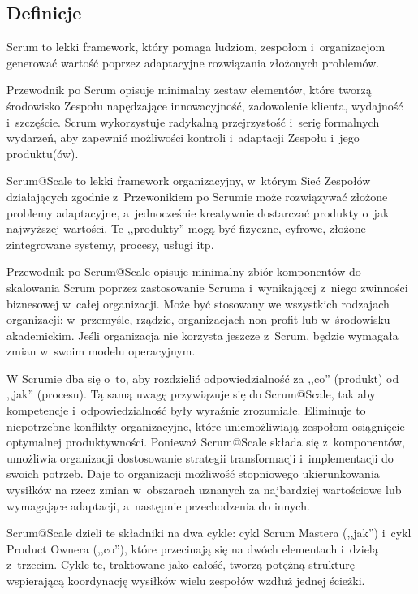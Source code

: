 \documentclass[12pt,a4paper,parskip=full]{scrartcl}
\begin{document}
\subsection{Definicje}\label{definitions}

Scrum to lekki framework, który pomaga ludziom, zespołom i~organizacjom generować wartość poprzez adaptacyjne rozwiązania złożonych problemów.

Przewodnik po Scrum opisuje minimalny zestaw elementów, które tworzą środowisko Zespołu napędzające innowacyjność, zadowolenie klienta, wydajność i~szczęście. Scrum wykorzystuje radykalną przejrzystość i~serię formalnych wydarzeń, aby zapewnić możliwości kontroli i~adaptacji Zespołu i~jego produktu(ów).

Scrum@Scale to lekki framework organizacyjny, w~którym Sieć Zespołów działających zgodnie z~Przewonikiem po Scrumie może rozwiązywać złożone problemy adaptacyjne, a~jednocześnie kreatywnie dostarczać produkty o~jak najwyższej wartości. Te ,,produkty'' mogą być fizyczne, cyfrowe, złożone zintegrowane systemy, procesy, usługi itp.

Przewodnik po Scrum@Scale opisuje minimalny zbiór komponentów do skalowania Scrum poprzez zastosowanie Scruma i~wynikającej z~niego zwinności biznesowej w~całej organizacji. Może być stosowany we wszystkich rodzajach organizacji: w~przemyśle, rządzie, organizacjach non-profit lub w~środowisku akademickim. Jeśli organizacja nie korzysta jeszcze z~Scrum, będzie wymagała zmian w~swoim modelu operacyjnym.

W Scrumie dba się o~to, aby rozdzielić odpowiedzialność za ,,co'' (produkt) od ,,jak'' (procesu). Tą samą uwagę przywiązuje się do Scrum@Scale, tak aby kompetencje i~odpowiedzialność były wyraźnie zrozumiałe. Eliminuje to niepotrzebne konflikty organizacyjne, które uniemożliwiają zespołom osiągnięcie optymalnej produktywności. Ponieważ Scrum@Scale składa się z~komponentów, umożliwia organizacji dos\-to\-so\-wa\-nie strategii transformacji i~implementacji do swoich potrzeb. Daje to organizacji możliwość stopniowego ukierunkowania wysiłków na rzecz zmian w~obszarach uznanych za najbardziej wartościowe lub wymagające adaptacji, a~następnie przechodzenia do innych.

Scrum@Scale dzieli te składniki na dwa cykle: cykl Scrum Mastera (,,jak'') i~cykl Product Ownera (,,co''), które przecinają się na dwóch elementach i~dzielą z~trzecim. Cykle te, traktowane jako całość, tworzą potężną strukturę wspierającą koordynację wysiłków wielu zespołów wzdłuż jednej ścieżki.
\end{document}
